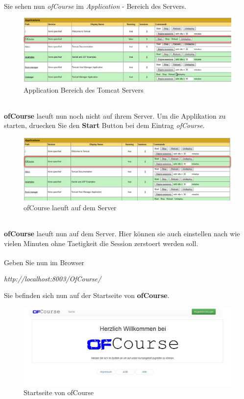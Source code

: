 \documentclass[a4paper, 12pt]{scrreprt}
\begin{document}
\ \\
Sie sehen nun {\it ofCourse} im {\it Application} - Bereich des Servers.
\begin{figure}[h]
\centering
\includegraphics[width=0.9\linewidth]{Grafiken/ApplicationBereichServerDeployed}
\caption{Application Bereich des Tomcat Servers}
\label{fig:ApplicationBereichServerDeployed}
\end{figure}
\ \\
\textbf{ofCourse} laeuft nun noch nicht auf ihrem Server. Um die Applikation zu starten, druecken Sie den \textbf{Start} Button bei dem Eintrag {\it ofCourse}.
\begin{figure}[ht]
\centering
\includegraphics[width=0.9\linewidth]{Grafiken/ofCourseDeployed}
\caption{ofCourse laeuft auf dem Server}
\label{fig:OfCourseDeployed}
\end{figure}
\newpage
\ \\
\textbf{ofCourse} laeuft nun auf dem Server. Hier können sie auch einstellen nach wie vielen Minuten ohne Taetigkeit die Session zerstoert werden soll.\ \\
\ \\
Geben Sie nun im Browser 
\begin{center}
	{\it http://localhost:8003/OfCourse/}
\end{center}
Sie befinden sich nun auf der Startseite von \textbf{ofCourse}.
\begin{figure}[h]
	\centering
	\includegraphics[width=0.8\linewidth]{Grafiken/indexPage}
	\caption[]{Startseite von ofCourse}
	\label{fig:indexPage1}
\end{figure} 
\end{document}
